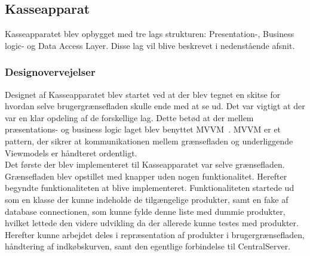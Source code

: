 \subsection{Kasseapparat}

Kasseapparatet blev opbygget med tre lags strukturen: Presentation-, Business logic- og Data Access Layer. Disse lag vil blive beskrevet i nedenstående afsnit.

\subsubsection{Designovervejelser}
Designet af Kasseapparatet blev startet ved at der blev tegnet en skitse for hvordan selve brugergrænsefladen skulle ende med at se ud.
Det var vigtigt at der var en klar opdeling af de forskellige lag. Dette betød at der mellem præsentations- og business logic laget blev benyttet MVVM~\cite{MVVM}. MVVM er et pattern, der sikrer at kommunikationen mellem grænsefladen og underliggende Viewmodels er håndteret ordentligt. \\
Det første der blev implementeret til Kasseapparatet var selve grænsefladen. Grænsefladen blev opstillet med knapper uden nogen funktionalitet. Herefter begyndte funktionaliteten at blive implementeret. Funktionaliteten startede ud som en klasse der kunne indeholde de tilgængelige produkter, samt en fake af database connectionen, som kunne fylde denne liste med dummie produkter, hvilket lettede den videre udvikling da der allerede kunne testes med produkter. Herefter kunne arbejdet deles i repræsentation af produkter i brugergrænsefladen, håndtering af indkøbskurven, samt den egentlige forbindelse til CentralServer.





